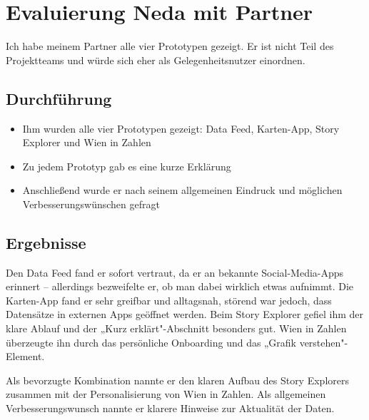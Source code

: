 \section{Evaluierung Neda mit Partner}

\noindent
Ich habe meinem Partner alle vier Prototypen gezeigt.
Er ist nicht Teil des Projektteams und würde sich
eher als Gelegenheitsnutzer einordnen.

\subsection{Durchführung}
\begin{itemize}
  \item Ihm wurden alle vier Prototypen gezeigt:
  Data Feed, Karten-App, Story Explorer und
  Wien in Zahlen
  \item Zu jedem Prototyp gab es eine kurze Erklärung
  \item Anschließend wurde er nach seinem allgemeinen
  Eindruck und möglichen Verbesserungswünschen gefragt
\end{itemize}

\subsection{Ergebnisse}
Den Data Feed fand er sofort vertraut, da er an
bekannte Social-Media-Apps erinnert – allerdings
bezweifelte er, ob man dabei wirklich etwas aufnimmt.
Die Karten-App fand er sehr greifbar und alltagsnah,
störend war jedoch, dass Datensätze in externen Apps
geöffnet werden. Beim Story Explorer gefiel ihm der
klare Ablauf und der „Kurz erklärt"-Abschnitt
besonders gut. Wien in Zahlen überzeugte ihn durch
das persönliche Onboarding und das
„Grafik verstehen"-Element.

Als bevorzugte Kombination nannte er den klaren
Aufbau des Story Explorers zusammen mit der
Personalisierung von Wien in Zahlen. Als allgemeinen
Verbesserungswunsch nannte er klarere Hinweise zur
Aktualität der Daten.
